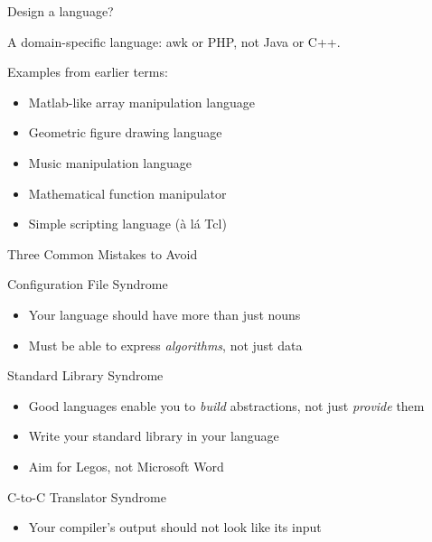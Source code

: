 \documentclass{plt}
\begin{document}
\begin{frame}{Design a language?}

A domain-specific language: awk or PHP, not Java or C++.

\medskip

\alert{Examples from earlier terms:}

  \begin{itemize}
    \itemsep=15pt

\item Matlab-like array manipulation language

\item Geometric figure drawing language

\item Music manipulation language

\item Mathematical function manipulator

\item Simple scripting language (\`a l\'a Tcl)
\end{itemize}

\end{frame}

\begin{frame}{Three Common Mistakes to Avoid}

Configuration File Syndrome

\begin{itemize}

\item Your language should have more than just nouns
  
\item Must be able to express \emph{algorithms}, not just data

\end{itemize}

Standard Library Syndrome

\begin{itemize}

\item Good languages enable you to \emph{build} abstractions, \break not just
  \emph{provide} them

\item Write your standard library in your language

\item Aim for Legos, not Microsoft Word
\end{itemize}

C-to-C Translator Syndrome
\begin{itemize}
\item Your compiler's output should not look like its input
\end{itemize}

\end{frame}
\end{document}
